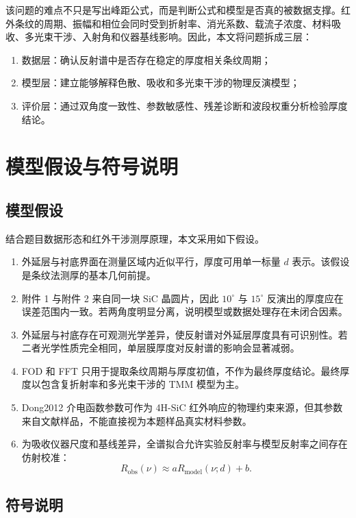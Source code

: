 \documentclass[UTF8,a4paper,12pt]{ctexart}
\begin{document}
该问题的难点不只是写出峰距公式，而是判断公式和模型是否真的被数据支撑。红外条纹的周期、振幅和相位会同时受到折射率、消光系数、载流子浓度、材料吸收、多光束干涉、入射角和仪器基线影响。因此，本文将问题拆成三层：
\begin{enumerate}
  \item 数据层：确认反射谱中是否存在稳定的厚度相关条纹周期；
  \item 模型层：建立能够解释色散、吸收和多光束干涉的物理反演模型；
  \item 评价层：通过双角度一致性、参数敏感性、残差诊断和波段权重分析检验厚度结论。
\end{enumerate}

\section{模型假设与符号说明}

\subsection{模型假设}

结合题目数据形态和红外干涉测厚原理，本文采用如下假设。

\begin{enumerate}
  \item 外延层与衬底界面在测量区域内近似平行，厚度可用单一标量 $d$ 表示。该假设是条纹法测厚的基本几何前提。
  \item 附件 1 与附件 2 来自同一块 SiC 晶圆片，因此 $10^\circ$ 与 $15^\circ$ 反演出的厚度应在误差范围内一致。若两角度明显分离，说明模型或数据处理存在未闭合因素。
  \item 外延层与衬底存在可观测光学差异，使反射谱对外延层厚度具有可识别性。若二者光学性质完全相同，单层膜厚度对反射谱的影响会显著减弱。
  \item FOD 和 FFT 只用于提取条纹周期与厚度初值，不作为最终厚度结论。最终厚度以包含复折射率和多光束干涉的 TMM 模型为主。
  \item Dong2012 介电函数参数可作为 4H-SiC 红外响应的物理约束来源，但其参数来自文献样品，不能直接视为本题样品真实材料参数。
  \item 为吸收仪器尺度和基线差异，全谱拟合允许实验反射率与模型反射率之间存在仿射校准：
  \begin{equation}
  R_{\mathrm{obs}}(\nu)\approx aR_{\mathrm{model}}(\nu;d)+b.
  \end{equation}
\end{enumerate}

\subsection{符号说明}
\end{document}
